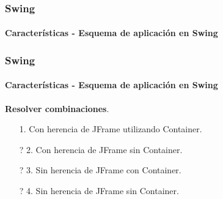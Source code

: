 \documentclass{beamer}
\begin{document}
    \begin{frame}
		\frametitle{Swing}
		\framesubtitle{Caracter\'isticas - Esquema de aplicaci\'on en Swing}
		
    		\begin{center}
		\end{center}
	\end{frame}
	
    \begin{frame}
		\frametitle{Swing}
		\framesubtitle{Caracter\'isticas - Esquema de aplicaci\'on en Swing}

		\textbf{Resolver combinaciones}.
		\begin{itemize}
		    \item[\checkmark] 1. Con herencia de JFrame utilizando Container.
		    \item[?] 2. Con herencia de JFrame sin Container.
		    \item[?] 3. Sin herencia de JFrame con Container.
		    \item[?] 4. Sin herencia de JFrame sin Container.
		\end{itemize}
	\end{frame}	
	
\end{document}

